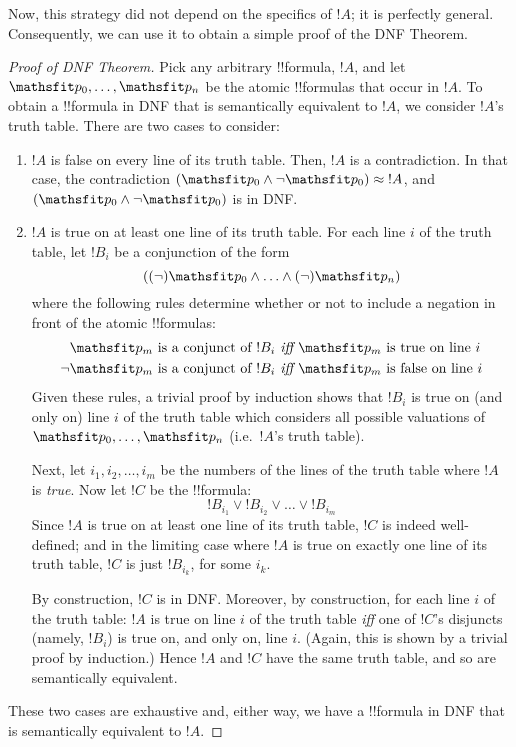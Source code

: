 \documentclass[../../../include/open-logic-section]{subfiles}
\begin{document}
Now, this strategy did not depend on the specifics of ${!A}$; it is perfectly general. Consequently, we can use it to obtain a simple proof of the DNF Theorem.

\begin{proof}[Proof of DNF Theorem]
Pick any arbitrary !!{formula}, ${!A}$, and let ${\Obj p_0}, \ldots, {\Obj p_n}$ be the atomic !!{formula}s that occur in ${!A}$. To obtain a !!{formula} in DNF that is semantically equivalent to ${!A}$, we consider ${!A}$'s truth table. There are two cases to consider:
	\begin{enumerate}
		\item ${!A}$ is false on every line of its truth table. Then, ${!A}$ is a contradiction. In that case, the contradiction $({\Obj p_0} \land \lnot {\Obj p_0}) \approx {!A}$, and $({\Obj p_0} \land \lnot {\Obj p_0})$ is in DNF. 
	
		\item ${!A}$ is true on at least one line of its truth table.
		For each line $i$ of the truth table, let $!B_i$ be a conjunction of the form 
		$$((\lnot){\Obj p_0} \land \ldots \land (\lnot){\Obj p_n})$$
		where the following rules determine whether or not to include a negation in front of the atomic !!{formula}s:
			\begin{align*}
				{\Obj p_m} \text{ is a conjunct of } !B_i&\emph{ iff }{\Obj p_m}\text{ is true on line }i\\
				\lnot{\Obj p_m}\text{ is a conjunct of }!B_i&\emph{ iff }{\Obj p_m}\text{ is false on line }i
			\end{align*}
		Given these rules, a trivial proof by induction shows that $!B_i$ is true on (and only on) line $i$ of the truth table which considers all possible valuations of ${\Obj p_0}, \ldots, {\Obj p_n}$ (i.e.\ ${!A}$'s truth table). 
		
		Next, let $i_1, i_2, \ldots, i_m$ be the numbers of the lines of the truth table where ${!A}$ is \emph{true}. Now let $!C$ be the !!{formula}:
		$${!B}_{i_1} \lor {!B}_{i_2} \lor \ldots \lor {!B}_{i_m}$$
		Since ${!A}$ is true on at least one line of its truth table, ${!C}$ is indeed well-defined; and in the limiting case where ${!A}$ is true on exactly one line of its truth table, ${!C}$ is just $!B_{i_k}$, for some $i_k$.
		
		By construction, $!C$ is in DNF. Moreover, by construction, for each line $i$ of the truth table: ${!A}$ is true on line $i$ of the truth table \emph{iff} one of $!C$'s disjuncts (namely, $!B_i$) is true on, and only on, line $i$. (Again, this is shown by a trivial proof by induction.) Hence ${!A}$ and $!C$ have the same truth table, and so are semantically equivalent.
	\end{enumerate}
	These two cases are exhaustive and, either way, we have a !!{formula} in DNF that is semantically  equivalent to $!A$.
\end{proof}
\end{document}
